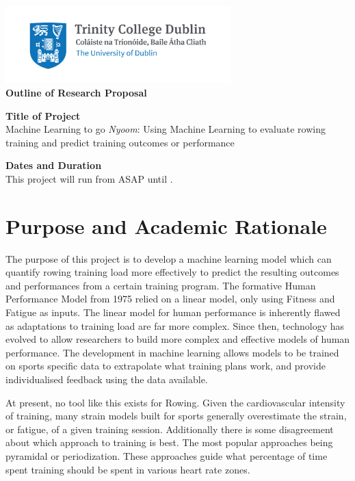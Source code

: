 \begin{center}
    \includegraphics[height=3cm]{info-sheet/Trinity_RGB_transparent_main.png}\\
    {\Large\textbf{Outline of Research Proposal}}
\end{center}

\textbf{Title of Project}\\
Machine Learning to go \textit{Nyoom}: Using Machine Learning to evaluate rowing training and predict training outcomes or performance

\textbf{Dates and Duration}\\
This project will run from ASAP until \deadline.

\section*{Purpose and Academic Rationale}
The purpose of this project is to develop a machine learning model which can quantify rowing training load more effectively to predict the resulting outcomes and performances from a certain training program. The formative Human Performance Model from 1975 relied on a linear model, only using Fitness and Fatigue as inputs. The linear model for human performance is inherently flawed as adaptations to training load are far more complex. Since then, technology has evolved to allow researchers to build more complex and effective models of human performance. The development in machine learning allows models to be trained on sports specific data to extrapolate what training plans work, and provide individualised feedback using the data available.

At present, no tool like this exists for Rowing. Given the cardiovascular intensity of training, many strain models built for sports generally overestimate the strain, or fatigue, of a given training session. Additionally there is some disagreement about which approach to training is best. The most popular approaches being pyramidal or periodization. These approaches guide what percentage of time spent training should be spent in various heart rate zones.

